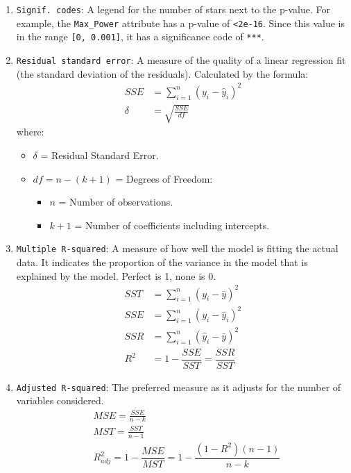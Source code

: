 \documentclass[a4paper]{article}
\begin{document}
\begin{enumerate}
    \item \verb|Signif. codes|: A legend for the number of stars next to the p-value. For example, the \verb|Max_Power| attribute has a p-value of \verb|<2e-16|. Since this value is in the range \verb|[0, 0.001]|, it has a significance code of \verb|***|.
    
    \item \verb|Residual standard error|: A measure of the quality of a linear regression fit (the standard deviation of the residuals). Calculated by the formula:
    \begin{align*}
        SSE &= \sum_{i=1}^n(y_i-\hat{y}_i)^2\\
        \delta &= \sqrt{\frac{SSE}{df}}
    \end{align*}
    where:
    \begin{itemize}
        \item $\delta$ = Residual Standard Error.
        \item $df = n - (k + 1)$ = Degrees of Freedom:
        \begin{itemize}
            \item $n$ = Number of observations.
            \item $k+1$ = Number of coefficients including intercepts.
        \end{itemize}
    \end{itemize}
    
    \item \verb|Multiple R-squared|: A measure of how well the model is fitting the actual data. It indicates the proportion of the variance in the model that is explained by the model. Perfect is 1, none is 0.
    \begin{align*}
        SST &= \sum_{i=1}^n(y_i-\bar{y})^2\\
	    SSE &= \sum_{i=1}^n(y_i-\hat{y}_i)^2\\
	    SSR &= \sum_{i=1}^n(\hat{y}_i-\bar{y})^2\\
	    R^2 &= 1 - \dfrac{SSE}{SST} = \dfrac{SSR}{SST}
    \end{align*}
    
    \item \verb|Adjusted R-squared|: The preferred measure as it adjusts for the number of variables considered.
    \begin{align*}
        &MSE = \frac{SSE}{n-k}\\
	    &MST = \frac{SST}{n-1}\\
	    &R^2_{adj} = 1 - \dfrac{MSE}{MST} = 1 - \dfrac{(1-R^2)(n-1)}{n-k}
    \end{align*}
    

\end{enumerate}
\end{document}
